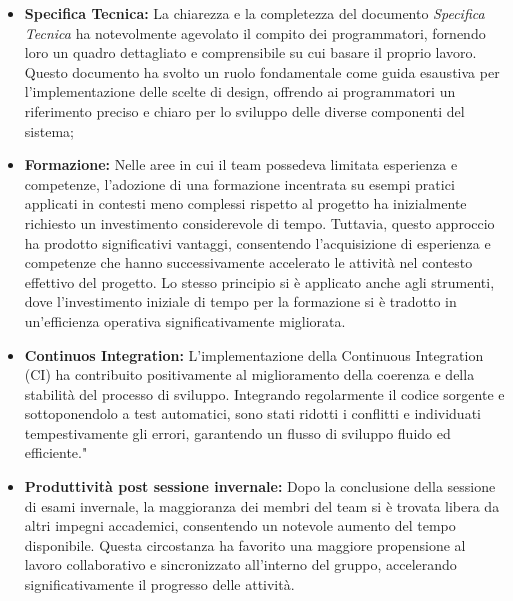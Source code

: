\begin{itemize}
    \item \textbf{Specifica Tecnica:} La chiarezza e la completezza del documento \textit{Specifica Tecnica} ha notevolmente agevolato il compito dei programmatori, fornendo loro un quadro dettagliato e comprensibile su cui basare il proprio lavoro. Questo documento ha svolto un ruolo fondamentale come guida esaustiva per l'implementazione delle scelte di design, offrendo ai programmatori un riferimento preciso e chiaro per lo sviluppo delle diverse componenti del sistema;
    \item \textbf{Formazione:} Nelle aree in cui il team possedeva limitata esperienza e competenze, l'adozione di una formazione incentrata su esempi pratici applicati in contesti meno complessi rispetto al progetto ha inizialmente richiesto un investimento considerevole di tempo. Tuttavia, questo approccio ha prodotto significativi vantaggi, consentendo l'acquisizione di esperienza e competenze che hanno successivamente accelerato le attività nel contesto effettivo del progetto. Lo stesso principio si è applicato anche agli strumenti, dove l'investimento iniziale di tempo per la formazione si è tradotto in un'efficienza operativa significativamente migliorata.
    \item \textbf{Continuos Integration:} L'implementazione della Continuous Integration (CI) ha contribuito positivamente al miglioramento della coerenza e della stabilità del processo di sviluppo. Integrando regolarmente il codice sorgente e sottoponendolo a test automatici, sono stati ridotti i conflitti e individuati tempestivamente gli errori, garantendo un flusso di sviluppo fluido ed efficiente."
    \item \textbf{Produttività post sessione invernale:} Dopo la conclusione della sessione di esami invernale, la maggioranza dei membri del team si è trovata libera da altri impegni accademici, consentendo un notevole aumento del tempo disponibile. Questa circostanza ha favorito una maggiore propensione al lavoro collaborativo e sincronizzato all'interno del gruppo, accelerando significativamente il progresso delle attività.
\end{itemize}